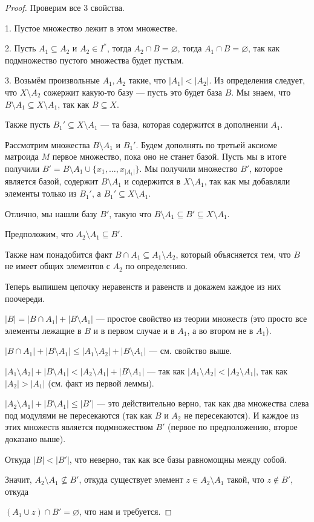 \begin{proof}

Проверим все 3 свойства.

1. Пустое множество лежит в этом множестве.

2. Пусть $A_1 \subseteq A_2$ и $A_2 \in I^*$, тогда $A_2 \cap B = \varnothing$,
тогда $A_1 \cap B = \varnothing$, так как подмножество пустого множества будет
пустым.

3. Возьмём произвольные $A_1, A_2$ такие, что $|A_1| < |A_2|$. Из определения
следует, что $X \setminus A_2$ сожержит какую-то базу --- пусть это будет база 
$B$. Мы знаем, что $B \setminus A_1 \subseteq X \setminus A_1$, так как $B \subseteq X$.

Также пусть $B_1' \subseteq X \setminus A_1$ --- та база, которая содержится в
дополнении $A_1$. 

Рассмотрим множества $B \setminus A_1$ и $B_1'$. Будем дополнять по третьей аксиоме
матроида $M$ первое множество, пока оно не станет базой. Пусть мы в итоге
получили $B' = B \setminus A_1 \cup \{x_1, \ldots, x_{|A_1|}\}$. Мы получили
множество $B'$, которое является базой, содержит $B \setminus A_1$ и содержится
в $X \setminus A_1$, так как мы добавляли элементы только из $B_1'$, а $B_1' \subseteq X \setminus A_1$.

Отлично, мы нашли базу $B'$, такую что $B \setminus A_1\subseteq B' \subseteq X \setminus A_1$.

Предположим, что $A_2 \setminus A_1 \subseteq B'$.

Также нам понадобится факт $B \cap A_1 \subseteq A_1 \setminus A_2$, который 
объясняется тем, что $B$ не имеет общих элементов с $A_2$ по определению.

Теперь выпишем цепочку неравенств и равенств и докажем каждое из них поочереди.

$|B| = |B \cap A_1| + |B \setminus A_1|$ --- простое свойство из теории множеств
(это просто все элементы лежащие в $B$ и в первом случае и в $A_1$, а во втором не в $A_1$).

$|B \cap A_1| + |B \setminus A_1| \leqslant |A_1 \setminus A_2| + |B \setminus A_1|$ ---
см. свойство выше.

$|A_1 \setminus A_2| + |B \setminus A_1| < |A_2 \setminus A_1| + |B \setminus A_1|$ ---
так как $|A_1 \setminus A_2|<|A_2 \setminus A_1|$, так как $|A_2| > |A_1|$ (см. факт
из первой леммы).

$|A_2 \setminus A_1| + |B \setminus A_1| \leqslant |B'|$ --- это 
действительно верно, так как два
множества слева под модулями не пересекаются (так как $B$ и $A_2$ не пересекаются).
И каждое из этих множеств является подмножеством $B'$ (первое по предположению, второе
доказано выше).

Откуда $|B| < |B'|$, что неверно, так как все базы равномощны между собой.

Значит, $A_2 \setminus A_1 \not\subseteq B'$, откуда существует элемент $z \in
A_2 \setminus A_1$ такой, что $z \not\in B'$, откуда 

\noindent$(A_1 \cup z) \cap B' = \varnothing$,
что нам и требуется.

\end{proof}

